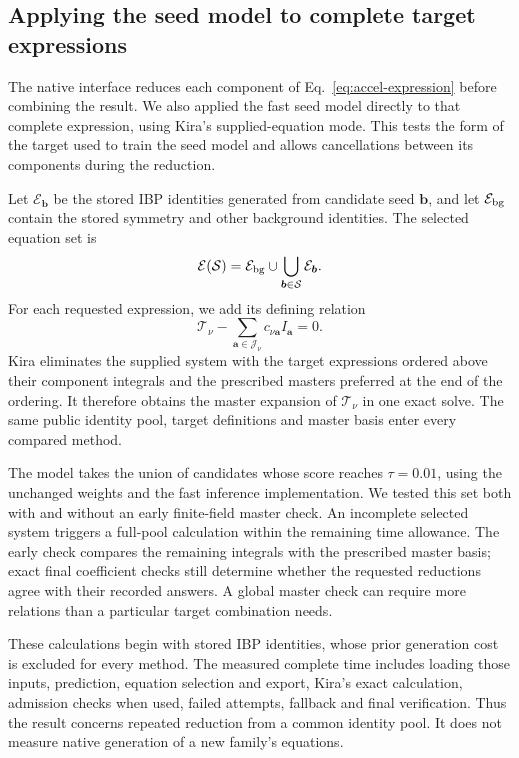 \subsection{Applying the seed model to complete target expressions}
The native interface reduces each component of
Eq.~\eqref{eq:accel-expression} before combining the result. We also
applied the fast seed model directly to that complete expression,
using Kira's supplied-equation mode. This tests the form of the target
used to train the seed model and allows cancellations between its
components during the reduction.

Let $\mathcal E_{\boldsymbol b}$ be the stored IBP identities generated
from candidate seed $\boldsymbol b$, and let
$\mathcal E_{\rm bg}$ contain the stored symmetry and other background
identities. The selected equation set is
\begin{equation}
 \mathcal E(\mathcal S)=\mathcal E_{\rm bg}\cup
       \bigcup_{\boldsymbol b\in\mathcal S}\mathcal E_{\boldsymbol b}.
\end{equation}
For each requested expression, we add its defining relation
\begin{equation}
 \mathcal T_\nu-
 \sum_{\boldsymbol a\in\mathcal J_\nu}
 c_{\nu\boldsymbol a}I_{\boldsymbol a}=0.
\end{equation}
Kira eliminates the supplied system with the target expressions ordered
above their component integrals and the prescribed masters preferred
at the end of the ordering. It therefore obtains the master expansion
of $\mathcal T_\nu$ in one exact solve. The same public identity pool,
target definitions and master basis enter every compared method.

The model takes the union of candidates whose score reaches
$\tau=0.01$, using the unchanged weights and the fast inference
implementation. We tested this set both with and without an early
finite-field master check. An incomplete selected system triggers a
full-pool calculation within the remaining time allowance. The early
check compares the remaining integrals with the prescribed master
basis; exact final coefficient checks still determine whether the requested reductions
agree with their recorded answers. A global master check can require
more relations than a particular target combination needs.

These calculations begin with stored IBP identities, whose prior
generation cost is excluded for every method. The measured complete
time includes loading those inputs, prediction, equation selection and
export, Kira's exact calculation, admission checks when used, failed
attempts, fallback and final verification. Thus the result concerns
repeated reduction from a common identity pool. It does not measure
native generation of a new family's equations.


